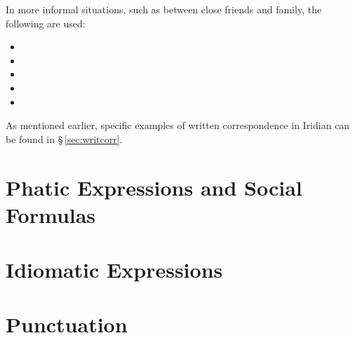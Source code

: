 In more informal situations, such as between close friends and family, the following are used:

\begin{itemize}[nosep]
	\item {}
	\item {}
	\item {}
	\item {}
	\item {}
\end{itemize}

As mentioned earlier, specific examples of written correspondence in Iridian can be found in \S\,\ref{sec:writcorr}.


\section{Phatic Expressions and Social Formulas}

\section{Idiomatic Expressions}

\section{Punctuation}